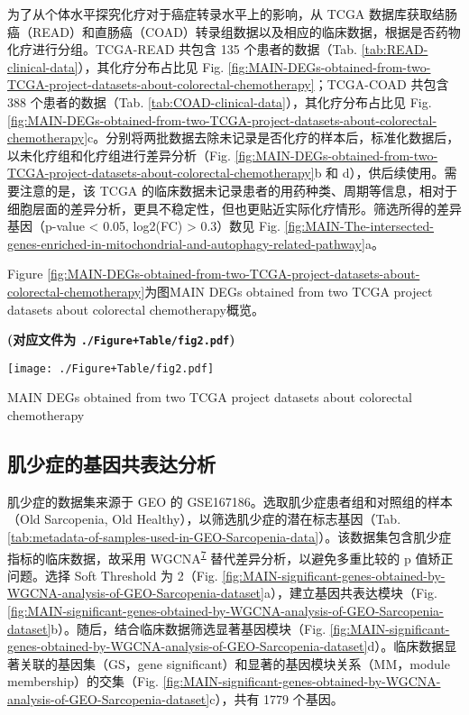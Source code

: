 \documentclass[
]{article}
\begin{document}
为了从个体水平探究化疗对于癌症转录水平上的影响，从 TCGA 数据库获取结肠癌（READ）和直肠癌（COAD）转录组数据以及相应的临床数据，根据是否药物化疗进行分组。TCGA-READ 共包含 135 个患者的数据（Tab. \ref{tab:READ-clinical-data}），其化疗分布占比见 Fig. \ref{fig:MAIN-DEGs-obtained-from-two-TCGA-project-datasets-about-colorectal-chemotherapy}；TCGA-COAD 共包含 388 个患者的数据（Tab. \ref{tab:COAD-clinical-data}），其化疗分布占比见 Fig. \ref{fig:MAIN-DEGs-obtained-from-two-TCGA-project-datasets-about-colorectal-chemotherapy}c。分别将两批数据去除未记录是否化疗的样本后，标准化数据后，以未化疗组和化疗组进行差异分析（Fig. \ref{fig:MAIN-DEGs-obtained-from-two-TCGA-project-datasets-about-colorectal-chemotherapy}b 和 d），供后续使用。需要注意的是，该 TCGA 的临床数据未记录患者的用药种类、周期等信息，相对于细胞层面的差异分析，更具不稳定性，但也更贴近实际化疗情形。筛选所得的差异基因（p-value \textless{} 0.05, \textbar log2(FC)\textbar{} \textgreater{} 0.3）数见 Fig. \ref{fig:MAIN-The-intersected-genes-enriched-in-mitochondrial-and-autophagy-related-pathway}a。

Figure \ref{fig:MAIN-DEGs-obtained-from-two-TCGA-project-datasets-about-colorectal-chemotherapy}为图MAIN DEGs obtained from two TCGA project datasets about colorectal chemotherapy概览。

\textbf{(对应文件为 \texttt{./Figure+Table/fig2.pdf})}

\def\@captype{figure}
\begin{center}
\texttt{[image: ./Figure+Table/fig2.pdf]}
\caption{MAIN DEGs obtained from two TCGA project datasets about colorectal chemotherapy}\label{fig:MAIN-DEGs-obtained-from-two-TCGA-project-datasets-about-colorectal-chemotherapy}
\end{center}

\hypertarget{SarSig}{%
\subsection{肌少症的基因共表达分析}\label{SarSig}}

肌少症的数据集来源于 GEO 的 GSE167186。选取肌少症患者组和对照组的样本（Old Sarcopenia, Old Healthy），以筛选肌少症的潜在标志基因（Tab. \ref{tab:metadata-of-samples-used-in-GEO-Sarcopenia-data}）。该数据集包含肌少症指标的临床数据，故采用 WGCNA\textsuperscript{\protect\hyperlink{ref-WgcnaAnRPacLangfe2008}{7}} 替代差异分析，以避免多重比较的 p 值矫正问题。选择 Soft Threshold 为 2（Fig. \ref{fig:MAIN-significant-genes-obtained-by-WGCNA-analysis-of-GEO-Sarcopenia-dataset}a），建立基因共表达模块（Fig. \ref{fig:MAIN-significant-genes-obtained-by-WGCNA-analysis-of-GEO-Sarcopenia-dataset}b）。随后，结合临床数据筛选显著基因模块（Fig. \ref{fig:MAIN-significant-genes-obtained-by-WGCNA-analysis-of-GEO-Sarcopenia-dataset}d）。临床数据显著关联的基因集（GS，gene significant）和显著的基因模块关系（MM，module membership）的交集（Fig. \ref{fig:MAIN-significant-genes-obtained-by-WGCNA-analysis-of-GEO-Sarcopenia-dataset}c），共有 1779 个基因。
\end{document}
